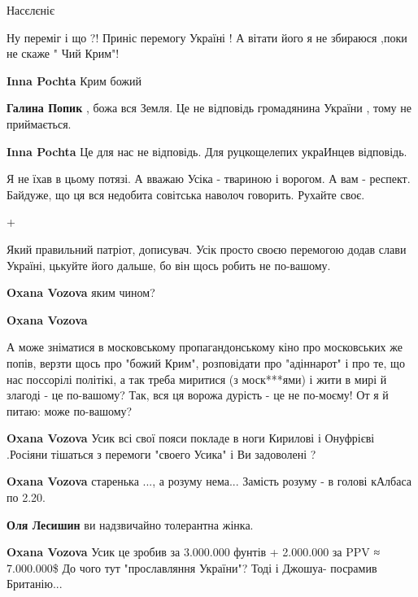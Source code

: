 \begin{itemize}
Насєлєніє

Ну переміг і що ?! Приніс перемогу Україні ! А вітати його я не збираюся ,поки не скаже " Чий Крим"!

\begin{itemize} %
\textbf{Inna Pochta} Крим божий

\textbf{Галина Попик} , божа вся Земля. Це не відповідь громадянина України , тому не приймається.

\textbf{Inna Pochta} Це для нас не відповідь.
Для руцкощелепих украИнцев відповідь.
\end{itemize} %


Я не їхав в цьому потязі. А вважаю Усіка - твариною і ворогом. А вам - респект.
Байдуже, що ця вся недобита совітська наволоч говорить. Рухайте своє.


+


Який правильний патріот, дописувач. Усік просто своєю перемогою додав слави
Україні, цькуйте його дальше, бо він щось робить не по-вашому.

\begin{itemize} %
\textbf{Oxana Vozova} яким чином?

\textbf{Oxana Vozova} 

А може зніматися в московському пропагандонському кіно про московських же
попів, верзти щось про "божий Крим", розповідати про "адіннарот" і про те, що
нас поссорілі політікі, а так треба миритися (з моск***ями) і жити в мирі й
злагоді - це по-вашому? Так, вся ця ворожа дурість - це не по-моєму! От я й
питаю: може по-вашому?


\textbf{Oxana Vozova}
Усик всі свої пояси покладе в ноги Кирилові і Онуфрієві .Росіяни тішаться з перемоги "своего Усика" і Ви задоволені ?

\textbf{Oxana Vozova} старенька ..., а розуму нема... Замість розуму - в голові кАлбаса по 2.20.

\textbf{Оля Лесишин} ви надзвичайно толерантна жінка.

\textbf{Oxana Vozova} Усик це зробив за 3.000.000 фунтів + 2.000.000 за PPV ≈ 7.000.000\$
До чого тут "прославляння України"? Тоді і Джошуа- посрамив Британію...


\end{itemize}
\end{itemize}
